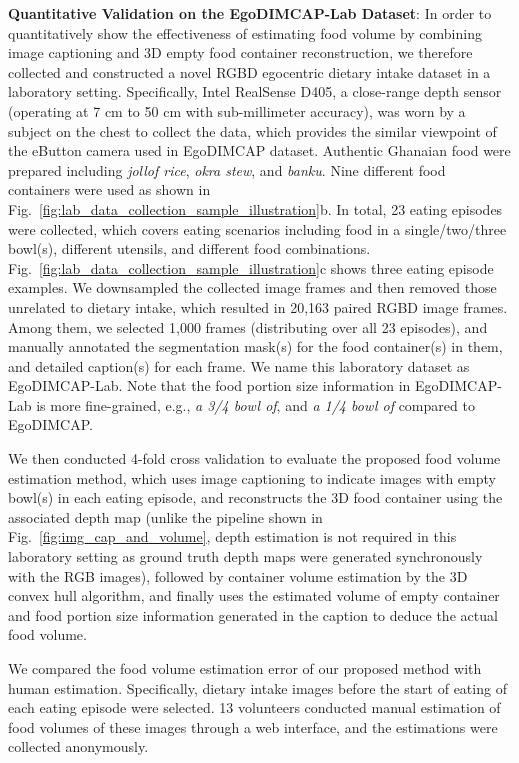 \documentclass[journal]{IEEEtran}
\begin{document}
\textbf{Quantitative Validation on the EgoDIMCAP-Lab Dataset}: In order to quantitatively show the effectiveness of estimating food volume by combining image captioning and 3D empty food container reconstruction, we therefore collected and constructed a novel RGBD egocentric dietary intake dataset in a laboratory setting. Specifically, Intel RealSense D405, a close-range depth sensor (operating at 7 cm to 50 cm with sub-millimeter accuracy), was worn by a subject on the chest to collect the data, which provides the similar viewpoint of the eButton camera used in EgoDIMCAP dataset. Authentic Ghanaian food were prepared including \textit{jollof rice}, \textit{okra stew}, and \textit{banku}. Nine different food containers were used as shown in Fig.~\ref{fig:lab_data_collection_sample_illustration}b. In total, 23 eating episodes were collected, which covers eating scenarios including food in a single/two/three bowl(s), different utensils, and different food combinations. Fig.~\ref{fig:lab_data_collection_sample_illustration}c shows three eating episode examples. We downsampled the collected image frames and then removed those unrelated to dietary intake, which resulted in 20,163 paired RGBD image frames. Among them, we selected 1,000 frames (distributing over all 23 episodes), and manually annotated the segmentation mask(s) for the food container(s) in them, and detailed caption(s) for each frame. We name this laboratory dataset as EgoDIMCAP-Lab. Note that the food portion size information in EgoDIMCAP-Lab is more fine-grained, e.g., \textit{a 3/4 bowl of}, and \textit{a 1/4 bowl of} compared to EgoDIMCAP.

We then conducted 4-fold cross validation to evaluate the proposed food volume estimation method, which uses image captioning to indicate images with empty bowl(s) in each eating episode, and reconstructs the 3D food container using the associated depth map (unlike the pipeline shown in Fig.~\ref{fig:img_cap_and_volume}, depth estimation is not required in this laboratory setting as ground truth depth maps were generated synchronously with the RGB images), followed by container volume estimation by the 3D convex hull algorithm, and finally uses the estimated volume of empty container and food portion size information generated in the caption to deduce the actual food volume.

We compared the food volume estimation error of our proposed method with human estimation. Specifically, dietary intake images before the start of eating of each eating episode were selected. 13 volunteers conducted manual estimation of food volumes of these images through a web interface, and the estimations were collected anonymously.
\end{document}
